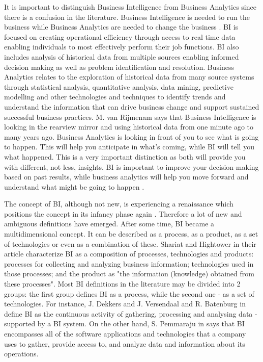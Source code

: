 \documentclass[runningheads]{llncs}
\begin{document}
It is important to distinguish Business Intelligence from Business Analytics since there is a confusion in the literature.  Business Intelligence is needed to run the business while Business Analytics are needed to change the business \cite{HEINZE}. BI is focused on creating operational efficiency through access to real time data enabling individuals to most effectively perform their job functions. BI also includes analysis of historical data from multiple sources enabling informed decision making as well as problem identification and resolution. Business Analytics relates to the exploration of historical data from many source systems through statistical analysis, quantitative analysis, data mining, predictive modelling and other technologies and techniques to identify trends and understand the information that can drive business change and support sustained successful business practices. M. van Rijmenam says that Business Intelligence is looking in the rearview mirror and using historical data from one minute ago to many years ago. Business Analytics is looking in front of you to see what is going to happen. This will help you anticipate in what's coming, while BI will tell you what happened. This is a very important distinction as both will provide you with different, not less, insights. BI is important to improve your decision-making based on past results, while business analytics will help you move forward and understand what might be going to happen \cite{HEINZE}.

The concept of BI, although not new, is experiencing a renaissance which positions the concept in its infancy phase again \cite{SHOLLO}. Therefore a lot of new and ambiguous definitions have emerged. After some time, BI became a multidimensional concept. It can be described as a process, as a product, as a set of technologies or even as a combination of these. Shariat and Hightower in their article \cite{SHARIAT} characterize BI as a composition of processes, technologies and products: processes for collecting and analyzing business information; technologies used in those processes; and the product as "the information (knowledge) obtained from these processes". Most BI definitions in the literature may be divided into 2 groups: the first group defines BI as a process, while the second one - as a set of technologies. For instance, J. Dekkers and J. Versendaal and R. Batenburg in \cite{DEKKERS} define BI as the continuous activity of gathering, processing and analysing data - supported by a BI system. On the other hand, S. Pemmaraju in \cite{RELATION} says that BI encompasses all of the software applications and technologies that a company uses to gather, provide access to, and analyze data and information about its operations. 
\end{document}

